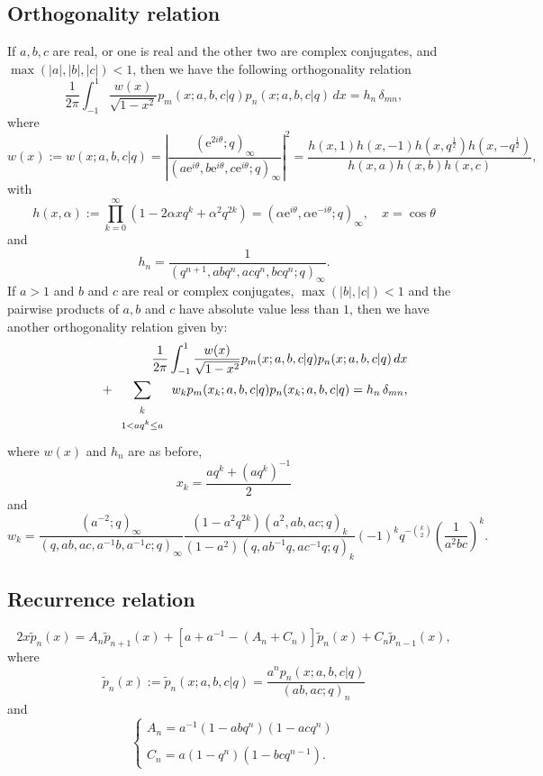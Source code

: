 \documentclass[envcountchap,graybox]{svmono}
\newcommand{\mathindent}{\hspace{7.5mm}}
\newcommand{\e}{\textrm{e}}
\begin{document}
\subsection*{Orthogonality relation}
If $a,b,c$ are real, or one is real and the other two are complex conjugates, and
$\max(|a|,|b|,|c|)<1$, then we have the following orthogonality relation
\begin{equation}
\label{OrtContDualqHahnI}
\frac{1}{2\pi}\int_{-1}^1\frac{w(x)}{\sqrt{1-x^2}}p_m(x;a,b,c|q)p_n(x;a,b,c|q)\,dx
=h_n\,\delta_{mn},
\end{equation}
where
$$w(x):=w(x;a,b,c|q)=\left|\frac{(\e^{2i\theta};q)_{\infty}}
{(a\e^{i\theta},b\e^{i\theta},c\e^{i\theta};q)_{\infty}}\right|^2=
\frac{h(x,1)h(x,-1)h(x,q^{\frac{1}{2}})h(x,-q^{\frac{1}{2}})}{h(x,a)h(x,b)h(x,c)},$$
with
$$h(x,\alpha):=\prod_{k=0}^{\infty}\left(1-2\alpha xq^k+\alpha^2q^{2k}\right)
=\left(\alpha\e^{i\theta},\alpha\e^{-i\theta};q\right)_{\infty},\quad x=\cos\theta$$
and
$$h_n=\frac{1}{(q^{n+1},abq^n,acq^n,bcq^n;q)_{\infty}}.$$
If $a>1$ and $b$ and $c$ are real or complex conjugates,
$\max(|b|,|c|)<1$ and the pairwise products of $a,b$ and $c$ have
absolute value less than $1$, then we have another orthogonality relation
given by:
\begin{eqnarray}
\label{OrtContDualqHahnII}
& &\frac{1}{2\pi}\int_{-1}^1\frac{w(x)}{\sqrt{1-x^2}}p_m(x;a,b,c|q)p_n(x;a,b,c|q)\,dx\nonumber\\
& &{}\mathindent{}+\sum_{\begin{array}{c}\scriptstyle k\\ \scriptstyle 1<aq^k\leq a\end{array}}
w_kp_m(x_k;a,b,c|q)p_n(x_k;a,b,c|q)=h_n\,\delta_{mn},
\end{eqnarray}
where $w(x)$ and $h_n$ are as before,
$$x_k=\frac{aq^k+\left(aq^k\right)^{-1}}{2}$$
and
$$w_k=\frac{(a^{-2};q)_{\infty}}{(q,ab,ac,a^{-1}b,a^{-1}c;q)_{\infty}}
\frac{(1-a^2q^{2k})(a^2,ab,ac;q)_k}{(1-a^2)(q,ab^{-1}q,ac^{-1}q;q)_k}
(-1)^kq^{-\binom{k}{2}}\left(\frac{1}{a^2bc}\right)^k.$$

\subsection*{Recurrence relation}
\begin{equation}
\label{RecContDualqHahn}
2x{\tilde p}_n(x)=A_n{\tilde p}_{n+1}(x)+\left[a+a^{-1}-\left(A_n+C_n\right)\right]{\tilde p}_n(x)+C_n{\tilde p}_{n-1}(x),
\end{equation}
where
$${\tilde p}_n(x):={\tilde p}_n(x;a,b,c|q)=\frac{a^np_n(x;a,b,c|q)}{(ab,ac;q)_n}$$
and
$$\left\{\begin{array}{l}
\displaystyle A_n=a^{-1}(1-abq^n)(1-acq^n)\\
\\
\displaystyle C_n=a(1-q^n)(1-bcq^{n-1}).
\end{array}\right.$$
\end{document}
